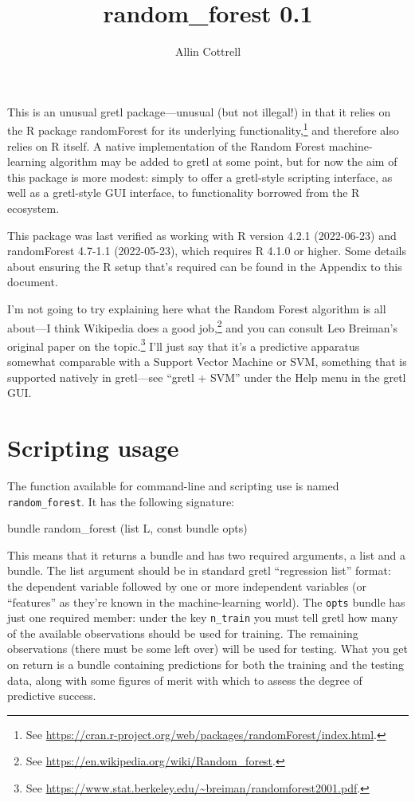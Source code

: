 \documentclass{article}
\begin{document}
\setlength{\parindent}{0pt}
\setlength{\parskip}{1ex}

\title{random\_forest 0.1} \author{Allin Cottrell}
\maketitle

This is an unusual gretl package---unusual (but not illegal!) in that
it relies on the \textsf{R} package \textsf{randomForest} for its
underlying functionality,\footnote{See
  \url{https://cran.r-project.org/web/packages/randomForest/index.html}.}
and therefore also relies on \textsf{R} itself. A native
implementation of the Random Forest machine-learning algorithm may be
added to gretl at some point, but for now the aim of this package is
more modest: simply to offer a gretl-style scripting interface, as
well as a gretl-style GUI interface, to functionality borrowed from
the \textsf{R} ecosystem.

This package was last verified as working with \textsf{R} version
4.2.1 (2022-06-23) and \textsf{randomForest} 4.7-1.1 (2022-05-23),
which requires \textsf{R} 4.1.0 or higher. Some details about ensuring
the \textsf{R} setup that's required can be found in the Appendix to
this document.

I'm not going to try explaining here what the Random Forest algorithm
is all about---I think Wikipedia does a good job,\footnote{See
  \url{https://en.wikipedia.org/wiki/Random_forest}.} and you can
consult Leo Breiman's original paper on the topic.\footnote{See
  \url{https://www.stat.berkeley.edu/~breiman/randomforest2001.pdf}.}
I'll just say that it's a predictive apparatus somewhat comparable
with a Support Vector Machine or SVM, something that is supported
natively in gretl---see ``gretl + SVM'' under the \textsf{Help} menu
in the gretl GUI.

\section{Scripting usage}

The function available for command-line and scripting use is named
\texttt{random\_forest}. It has the following signature:
%
\begin{code}
bundle random_forest (list L, const bundle opts)
\end{code}
%
This means that it returns a bundle and has two required arguments, a
list and a bundle. The list argument should be in standard gretl
``regression list'' format: the dependent variable followed by one or
more independent variables (or ``features'' as they're known in the
machine-learning world). The \texttt{opts} bundle has just one
required member: under the key \texttt{n\_train} you must tell gretl
how many of the available observations should be used for training.
The remaining observations (there must be some left over) will be used
for testing. What you get on return is a bundle containing predictions
for both the training and the testing data, along with some figures of
merit with which to assess the degree of predictive success.
\end{document}
